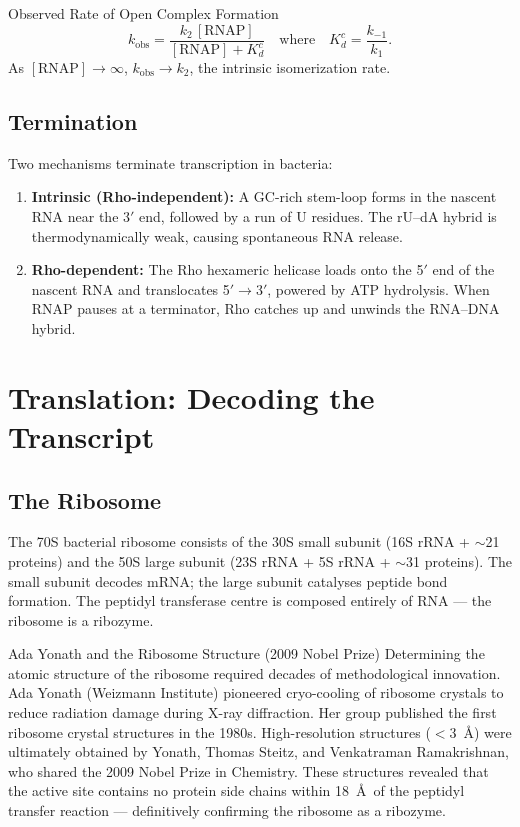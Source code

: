 \documentclass[12pt, a4paper, oneside]{report}
\begin{document}
\begin{definition}{Observed Rate of Open Complex Formation}
  \[
    k_\text{obs} = \frac{k_2 \, [\text{RNAP}]}{[\text{RNAP}] + K_d^c}
    \quad\text{where}\quad K_d^c = \frac{k_{-1}}{k_1}.
  \]
  As $[\text{RNAP}] \to \infty$, $k_\text{obs} \to k_2$, the intrinsic
  isomerization rate.
\end{definition}

\subsection{Termination}

Two mechanisms terminate transcription in bacteria:
\begin{enumerate}
  \item \textbf{Intrinsic (Rho-independent):} A GC-rich stem-loop forms in
        the nascent RNA near the 3$'$ end, followed by a run of U residues.
        The rU--dA hybrid is thermodynamically weak, causing spontaneous
        RNA release.
  \item \textbf{Rho-dependent:} The Rho hexameric helicase loads onto the
        5$'$ end of the nascent RNA and translocates 5$'\to$3$'$,
        powered by ATP hydrolysis. When RNAP pauses at a terminator,
        Rho catches up and unwinds the RNA--DNA hybrid.
\end{enumerate}

\section{Translation: Decoding the Transcript}

\subsection{The Ribosome}

The 70S bacterial ribosome consists of the 30S small subunit (16S rRNA +
$\sim$21 proteins) and the 50S large subunit (23S rRNA + 5S rRNA +
$\sim$31 proteins). The small subunit decodes mRNA; the large subunit
catalyses peptide bond formation. The peptidyl transferase centre is
composed entirely of RNA — the ribosome is a ribozyme.

\begin{historicalnote}{Ada Yonath and the Ribosome Structure (2009 Nobel Prize)}
  Determining the atomic structure of the ribosome required decades of
  methodological innovation. Ada Yonath (Weizmann Institute) pioneered
  cryo-cooling of ribosome crystals to reduce radiation damage during
  X-ray diffraction. Her group published the first ribosome crystal
  structures in the 1980s. High-resolution structures ($<3$~\AA) were
  ultimately obtained by Yonath, Thomas Steitz, and Venkatraman
  Ramakrishnan, who shared the 2009 Nobel Prize in Chemistry. These
  structures revealed that the active site contains no protein side
  chains within 18~\AA\ of the peptidyl transfer reaction — definitively
  confirming the ribosome as a ribozyme.
\end{historicalnote}
\end{document}

